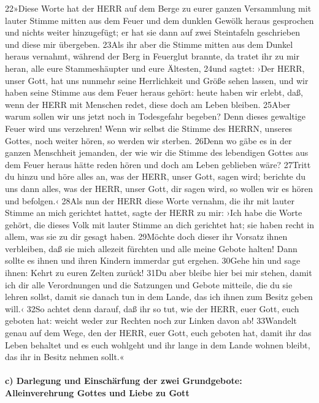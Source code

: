 22»Diese Worte hat der HERR auf dem Berge zu eurer ganzen Versammlung
mit lauter Stimme mitten aus dem Feuer und dem dunklen Gewölk heraus
gesprochen und nichts weiter hinzugefügt; er hat sie dann auf zwei
Steintafeln geschrieben und diese mir übergeben. 23Als ihr aber die
Stimme mitten aus dem Dunkel heraus vernahmt, während der Berg in
Feuerglut brannte, da tratet ihr zu mir heran, alle eure Stammeshäupter
und eure Ältesten, 24und sagtet: ›Der HERR, unser Gott, hat uns nunmehr
seine Herrlichkeit und Größe sehen lassen, und wir haben seine Stimme
aus dem Feuer heraus gehört: heute haben wir erlebt, daß, wenn der HERR
mit Menschen redet, diese doch am Leben bleiben. 25Aber warum sollen wir
uns jetzt noch in Todesgefahr begeben? Denn dieses gewaltige Feuer wird
uns verzehren! Wenn wir selbst die Stimme des HERRN, unseres Gottes,
noch weiter hören, so werden wir sterben. 26Denn wo gäbe es in der
ganzen Menschheit jemanden, der wie wir die Stimme des lebendigen Gottes
aus dem Feuer heraus hätte reden hören und doch am Leben geblieben wäre?
27Tritt du hinzu und höre alles an, was der HERR, unser Gott, sagen
wird; berichte du uns dann alles, was der HERR, unser Gott, dir sagen
wird, so wollen wir es hören und befolgen.‹ 28Als nun der HERR diese
Worte vernahm, die ihr mit lauter Stimme an mich gerichtet hattet, sagte
der HERR zu mir: ›Ich habe die Worte gehört, die dieses Volk mit lauter
Stimme an dich gerichtet hat; sie haben recht in allem, was sie zu dir
gesagt haben. 29Möchte doch dieser ihr Vorsatz ihnen verbleiben, daß sie
mich allezeit fürchten und alle meine Gebote halten! Dann sollte es
ihnen und ihren Kindern immerdar gut ergehen. 30Gehe hin und sage ihnen:
Kehrt zu euren Zelten zurück! 31Du aber bleibe hier bei mir stehen,
damit ich dir alle Verordnungen und die Satzungen und Gebote mitteile,
die du sie lehren sollst, damit sie danach tun in dem Lande, das ich
ihnen zum Besitz geben will.‹ 32So achtet denn darauf, daß ihr so tut,
wie der HERR, euer Gott, euch geboten hat: weicht weder zur Rechten noch
zur Linken davon ab! 33Wandelt genau auf dem Wege, den der HERR, euer
Gott, euch geboten hat, damit ihr das Leben behaltet und es euch
wohlgeht und ihr lange in dem Lande wohnen bleibt, das ihr in Besitz
nehmen sollt.«

\hypertarget{c-darlegung-und-einschuxe4rfung-der-zwei-grundgebote-alleinverehrung-gottes-und-liebe-zu-gott}{%
\paragraph{c) Darlegung und Einschärfung der zwei Grundgebote:
Alleinverehrung Gottes und Liebe zu
Gott}\label{c-darlegung-und-einschuxe4rfung-der-zwei-grundgebote-alleinverehrung-gottes-und-liebe-zu-gott}}

